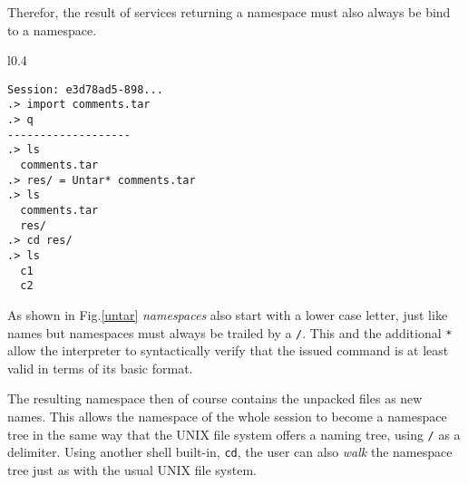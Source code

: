 Therefor, the result of services returning a namespace must
also always be bind to a namespace.

\begin{wrapfigure}{l}{0.4\textwidth}
  \begin{lstlisting}
Session: e3d78ad5-898...
.> import comments.tar
.> q
-------------------
.> ls
  comments.tar
.> res/ = Untar* comments.tar
.> ls
  comments.tar
  res/
.> cd res/
.> ls
  c1
  c2
  \end{lstlisting}
  \caption{Example of a name space binding.}
  \label{untar}
\end{wrapfigure}

As shown in Fig.\ref{untar} \textit{namespaces} also start with
a lower case letter, just like names but namespaces must always
be trailed by a \texttt{/}. This and the additional \texttt{*}
allow the interpreter to syntactically verify that the issued
command is at least valid in terms of its basic format.

The resulting namespace then of course contains the unpacked
files as new names. This allows the namespace of the whole session
to become a namespace tree in the same way that the UNIX file system
offers a naming tree, using \texttt{/} as a delimiter. Using another
shell built-in, \texttt{cd}, the user can also \textit{walk} the
namespace tree just as with the usual UNIX file system.
